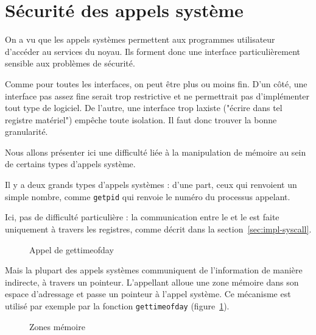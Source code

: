 \section{Sécurité des appels système}

On a vu que les appels systèmes permettent aux programmes utilisateur d'accéder
au services du noyau. Ils forment donc une interface particulièrement sensible aux
problèmes de sécurité.

Comme pour toutes les interfaces, on peut être plus ou moins fin. D'un
côté, une interface pas assez fine serait trop restrictive et ne permettrait pas
d'implémenter tout type de logiciel. De l'autre, une interface trop laxiste
("écrire dans tel registre matériel") empêche toute isolation. Il faut donc
trouver la bonne granularité.

Nous allons présenter ici une difficulté liée à la manipulation de mémoire au
sein de certains types d'appels système.

Il y a deux grands types d'appels systèmes : d'une part, ceux qui renvoient un
simple nombre, comme \texttt{getpid} qui renvoie le numéro du processus
appelant.


Ici, pas de difficulté particulière : la communication entre le  et le
 est faite uniquement à travers les registres, comme décrit dans la
section~\ref{sec:impl-syscall}.

\begin{figure}
\caption{Appel de gettimeofday}
\label{fig:appel-gettimeofday}
\end{figure}

Mais la plupart des appels systèmes communiquent de l'information de manière
indirecte, à travers un pointeur. L'appellant alloue une zone mémoire dans son
espace d'adressage et passe un pointeur à l'appel système. Ce mécanisme est
utilisé par exemple par la fonction \texttt{gettimeofday}
(figure~\ref{fig:appel-gettimeofday}).

\begin{figure}
    \centering



    \caption{Zones mémoire}
    \label{fig:mzones}
\end{figure} %

